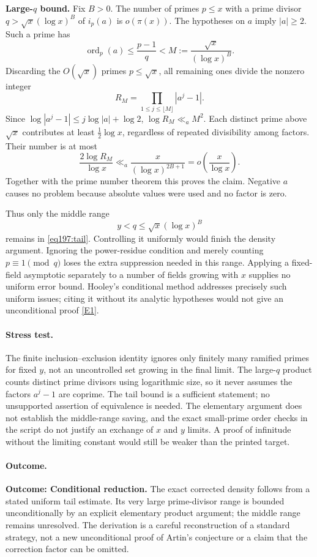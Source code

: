 \documentclass[11pt,a4paper]{article}
\newcommand{\eref}[2]{\hyperlink{extra:#1:#2}{[E#2]}}
\numberwithin{equation}{section}
\begin{document}
\textbf{Large-$q$ bound.} Fix $B>0$. The number of primes $p\le x$ with a prime divisor
$q>\sqrt x(\log x)^B$ of $i_p(a)$ is $o(\pi(x))$.
The hypotheses on $a$ imply $|a|\ge2$. Such a prime has
\[
 \operatorname{ord}_p(a)\le\frac{p-1}{q}<M:=\frac{\sqrt x}{(\log x)^B}.
\]
Discarding the $O(\sqrt x)$ primes $p\le\sqrt x$, all remaining ones divide the nonzero integer
\[
 R_M=\prod_{1\le j\le\lfloor M\rfloor}|a^j-1|.
\]
Since $\log|a^j-1|\le j\log|a|+\log2$,
$\log R_M\ll_a M^2$. Each distinct prime above $\sqrt x$ contributes at least $\tfrac12\log x$, regardless of repeated divisibility among factors. Their number is at most
\[
 \frac{2\log R_M}{\log x}
 \ll_a\frac{x}{(\log x)^{2B+1}}=o\!\left(\frac{x}{\log x}\right).
\]
Together with the prime number theorem this proves the claim. Negative $a$ causes no problem because absolute values were used and no factor is zero.

Thus only the middle range
\[
 y<q\le\sqrt x(\log x)^B
\]
remains in \eqref{eq197:tail}. Controlling it uniformly would finish the density argument. Ignoring the power-residue condition and merely counting $p\equiv1\pmod q$ loses the extra suppression needed in this range. Applying a fixed-field asymptotic separately to a number of fields growing with $x$ supplies no uniform error bound. Hooley's conditional method addresses precisely such uniform issues; citing it without its analytic hypotheses would not give an unconditional proof \eref{197}{1}.

\paragraph{Stress test.}
The finite inclusion--exclusion identity ignores only finitely many ramified primes for fixed $y$, not an uncontrolled set growing in the final limit. The large-$q$ product counts distinct prime divisors using logarithmic size, so it never assumes the factors $a^j-1$ are coprime. The tail bound is a sufficient statement; no unsupported assertion of equivalence is needed. The elementary argument does not establish the middle-range saving, and the exact small-prime order checks in the script do not justify an exchange of $x$ and $y$ limits. A proof of infinitude without the limiting constant would still be weaker than the printed target.

\paragraph{Outcome.}
\textbf{Outcome: Conditional reduction.}
The exact corrected density follows from a stated uniform tail estimate. Its very large prime-divisor range is bounded unconditionally by an explicit elementary product argument; the middle range remains unresolved. The derivation is a careful reconstruction of a standard strategy, not a new unconditional proof of Artin's conjecture or a claim that the correction factor can be omitted.
\end{document}
